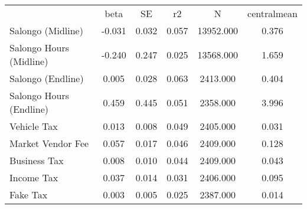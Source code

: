 {\def\sym#1{\ifmmode^{#1}\else\(^{#1}\)\fi} \begin{tabular}{l*{5}{c}} \hline\hline 
& beta & SE & r2 & N & centralmean \\
Salongo (Midline) & -0.031 & 0.032 & 0.057 & 13952.000 & 0.376 \\
Salongo Hours (Midline) & -0.240 & 0.247 & 0.025 & 13568.000 & 1.659 \\
Salongo (Endline) & 0.005 & 0.028 & 0.063 & 2413.000 & 0.404 \\
Salongo Hours (Endline) & 0.459 & 0.445 & 0.051 & 2358.000 & 3.996 \\
Vehicle Tax & 0.013 & 0.008 & 0.049 & 2405.000 & 0.031 \\
Market Vendor Fee & 0.057 & 0.017 & 0.046 & 2409.000 & 0.128 \\
Business Tax & 0.008 & 0.010 & 0.044 & 2409.000 & 0.043 \\
Income Tax & 0.037 & 0.014 & 0.031 & 2406.000 & 0.095 \\
Fake Tax & 0.003 & 0.005 & 0.025 & 2387.000 & 0.014 \\
\hline\hline \end{tabular} }
